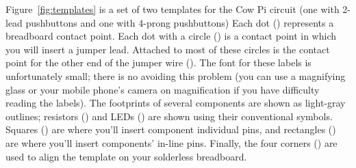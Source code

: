 Figure~\ref{fig:templates} is a set of two %
templates for the Cow Pi circuit %
(one with 2-lead pushbuttons and one with 4-prong pushbuttons)
Each dot () represents a breadboard contact point.
Each dot with a circle () is a contact point in which you will insert a jumper lead.
Attached to most of these circles is the contact point for the other end of the jumper wire ().
The font for these labels is unfortunately small;
there is no avoiding this problem
(you can use a magnifying glass or your mobile phone's camera on magnification if you have difficulty reading the labels).
The footprints of several components are shown as light-gray outlines;
resistors () and LEDs () are shown using their conventional symbols.
Squares () are where you'll insert component individual pins,
and rectangles () are where you'll insert components' in-line pins.
Finally, the four corners () are used to align the template on your solderless breadboard.

